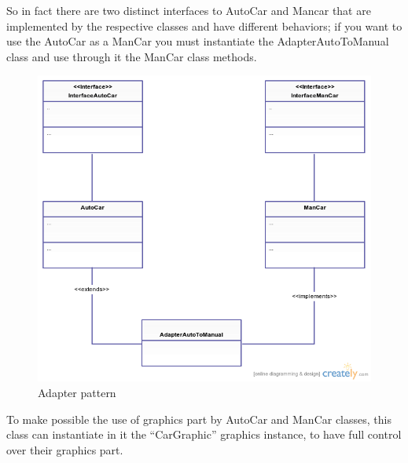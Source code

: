 \documentclass[a4paper,titlepage]{article}
\begin{document}
So in fact there are two distinct interfaces to AutoCar and Mancar that are implemented by the respective classes and have different behaviors; if you want to use the AutoCar as a ManCar you must instantiate the AdapterAutoToManual class and use through it the ManCar class methods.

\begin{figure}[!ht]
\centering
\includegraphics[scale=0.4]{adapter.png}
\caption{Adapter pattern}
\end{figure}


\newpage

To make possible the use of graphics part by AutoCar and ManCar classes, this class can instantiate in it the ``CarGraphic'' graphics instance, to have full control over their graphics part.
\end{document}

